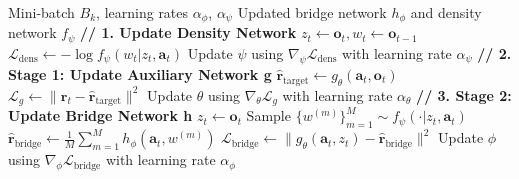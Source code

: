 \documentclass{article}
\begin{document}
\begin{algorithm}
\caption{Update Causal Networks}
\label{alg:causal-networks}
\begin{algorithmic}[1]
\Require Mini-batch $B_k$, learning rates $\alpha_\phi$, $\alpha_\psi$
\Ensure Updated bridge network $h_\phi$ and density network $f_\psi$
\State \textbf{// 1. Update Density Network}
    \State $z_t \leftarrow \mathbf{o}_t, w_t \leftarrow \mathbf{o}_{t-1}$ 
    \State $\mathcal{L}_{\text{dens}} \leftarrow -\log f_\psi(w_t | z_t, \mathbf{a}_t)$
    \State Update $\psi$ using $\nabla_\psi \mathcal{L}_{\text{dens}}$ with learning rate $\alpha_\psi$
\EndFor
\State \textbf{// 2. Stage 1: Update Auxiliary Network g}
    \State $\mathbf{\hat{r}}_{\text{target}} \leftarrow g_\theta(\mathbf{a}_t, \mathbf{o}_t)$ 
    \State $\mathcal{L}_{g} \leftarrow \|\mathbf{r}_t - \mathbf{\hat{r}}_{\text{target}}\|^2$
    \State Update $\theta$ using $\nabla_\theta \mathcal{L}_{g}$ with learning rate $\alpha_\theta$
\EndFor
\State \textbf{// 3. Stage 2: Update Bridge Network h}
    \State $z_t \leftarrow \mathbf{o}_t$
    \State Sample $\{w^{(m)}\}_{m=1}^M \sim f_\psi(\cdot | z_t, \mathbf{a}_t)$
    \State $\mathbf{\hat{r}}_{\text{bridge}} \leftarrow \frac{1}{M} \sum_{m=1}^M h_\phi(\mathbf{a}_t, w^{(m)})$
    \State $\mathcal{L}_{\text{bridge}} \leftarrow \|g_\theta(\mathbf{a}_t, z_t) -\mathbf{\hat{r}}_{\text{bridge}}\|^2$ 
    \State Update $\phi$ using $\nabla_\phi \mathcal{L}_{\text{bridge}}$ with learning rate $\alpha_\phi$
\EndFor
\end{algorithmic}
\end{algorithm}
\end{document}
